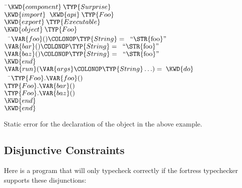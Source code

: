 \begin{Fortress}
{\tt~}\pushtabs\=\+\( \KWD{component}\:\TYP{Surprise}\)\\
\( \KWD{import}\;\;\KWD{api}\:\TYP{Foo}\)\\
\( \KWD{export}\:\TYP{Executable}\)\\[4pt]
\( \KWD{object}\:\TYP{Foo}\)\\
{\tt~~}\pushtabs\=\+\(   \VAR{foo}()\COLONOP\TYP{String} =\;\;\hbox{\rm``\STR{foo}''}\)\\
\(   \VAR{bar}()\COLONOP\TYP{String} =\;\;\hbox{\rm``\STR{foo}''}\)\\
\(   \VAR{baz}()\COLONOP\TYP{String} =\;\;\hbox{\rm``\STR{foo}''}\)\-\\\poptabs
\( \KWD{end}\)\\[4pt]
\( \VAR{run}(\VAR{args}\COLONOP\TYP{String}\ldots) = \;\KWD{do}\)\\
{\tt~~}\pushtabs\=\+\(   \TYP{Foo}.\VAR{foo}()\)\\
\(   \TYP{Foo}.\VAR{bar}()\)\\
\(   \TYP{Foo}.\VAR{baz}()\)\-\\\poptabs
\( \KWD{end}\)\\[4pt]
\( \KWD{end}\)\-\\\poptabs
\end{Fortress}

Static error for the declaration of the object  in the above example.

\subsection{Disjunctive Constraints}

Here is a program that will only typecheck correctly if the fortress typechecker supports these disjunctions:







